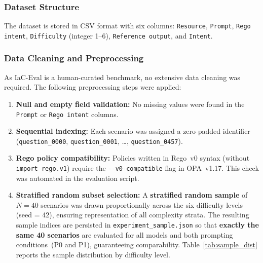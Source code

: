 \subsubsection{Dataset Structure}

The dataset is stored in CSV format with six columns:
\texttt{Resource}, \texttt{Prompt}, \texttt{Rego intent},
\texttt{Difficulty} (integer 1--6), \texttt{Reference output}, and
\texttt{Intent}.

\subsubsection{Data Cleaning and Preprocessing}

As IaC-Eval is a human-curated benchmark, no extensive data cleaning
was required. The following preprocessing steps were applied:

\begin{enumerate}[leftmargin=*]
    \item \textbf{Null and empty field validation:} No missing values
          were found in the \texttt{Prompt} or \texttt{Rego intent}
          columns.
    \item \textbf{Sequential indexing:} Each scenario was assigned a
          zero-padded identifier (\texttt{question\_0000},
          \texttt{question\_0001}, \ldots, \texttt{question\_0457}).
    \item \textbf{Rego policy compatibility:} Policies written in
          Rego~v0 syntax (without \texttt{import rego.v1}) require
          the \texttt{-{}-v0-compatible} flag in OPA~v1.17. This
          check was automated in the evaluation script.
    \item \textbf{Stratified random subset selection:} A
          \textbf{stratified random sample} of $N = 40$ scenarios
          was drawn proportionally across the six difficulty
          levels (seed = 42), ensuring representation of all
          complexity strata. The resulting sample indices are
          persisted in \texttt{experiment\_sample.json} so that
          \textbf{exactly the same 40 scenarios} are evaluated for
          all models and both prompting conditions~(P0 and P1),
          guaranteeing comparability. Table~\ref{tab:sample_dist}
          reports the sample distribution by difficulty level.
\end{enumerate}


